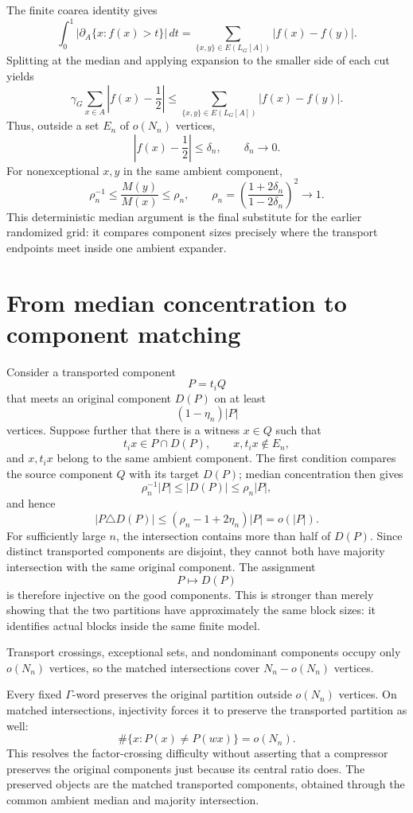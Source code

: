 \documentclass[10pt,openany]{book}
\begin{document}
The finite coarea identity gives
\[
 \int_0^1\left|\partial_A\{x:f(x)>t\}\right|\,dt
 =
 \sum_{\{x,y\}\in E(L_G[A])}|f(x)-f(y)|.
\]
Splitting at the median and applying expansion to the smaller side of each cut yields
\[
 \gamma_G\sum_{x\in A}\left|f(x)-\frac12\right|
 \le
 \sum_{\{x,y\}\in E(L_G[A])}|f(x)-f(y)|.
\]
Thus, outside a set $E_n$ of $o(N_n)$ vertices,
\[
 \left|f(x)-\frac12\right|\le\delta_n,
 \qquad
 \delta_n\longrightarrow0.
\]
For nonexceptional $x,y$ in the same ambient component,
\[
 \rho_n^{-1}\le\frac{M(y)}{M(x)}\le\rho_n,
 \qquad
 \rho_n=\left(\frac{1+2\delta_n}{1-2\delta_n}\right)^2\longrightarrow1.
\]
This deterministic median argument is the final substitute for the earlier randomized grid: it compares component sizes precisely where the transport endpoints meet inside one ambient expander.

\section{From median concentration to component matching}

Consider a transported component
\[
 P=t_iQ
\]
that meets an original component $D(P)$ on at least
\[
 (1-\eta_n)|P|
\]
vertices. Suppose further that there is a witness $x\in Q$ such that
\[
 t_ix\in P\cap D(P),
 \qquad
 x,t_ix\notin E_n,
\]
and $x,t_ix$ belong to the same ambient component. The first condition compares the source component $Q$ with its target $D(P)$; median concentration then gives
\[
 \rho_n^{-1}|P|\le |D(P)|\le\rho_n|P|,
\]
and hence
\[
 |P\triangle D(P)|
 \le(\rho_n-1+2\eta_n)|P|
 =o(|P|).
\]
For sufficiently large $n$, the intersection contains more than half of $D(P)$. Since distinct transported components are disjoint, they cannot both have majority intersection with the same original component. The assignment
\[
 P\longmapsto D(P)
\]
is therefore injective on the good components. This is stronger than merely showing that the two partitions have approximately the same block sizes: it identifies actual blocks inside the same finite model.

Transport crossings, exceptional sets, and nondominant components occupy only $o(N_n)$ vertices, so the matched intersections cover $N_n-o(N_n)$ vertices.

Every fixed $\Gamma$-word preserves the original partition outside $o(N_n)$ vertices. On matched intersections, injectivity forces it to preserve the transported partition as well:
\[
 \#\{x:P(x)\ne P(wx)\}=o(N_n).
\]
This resolves the factor-crossing difficulty without asserting that a compressor preserves the original components just because its central ratio does. The preserved objects are the matched transported components, obtained through the common ambient median and majority intersection.
\end{document}
